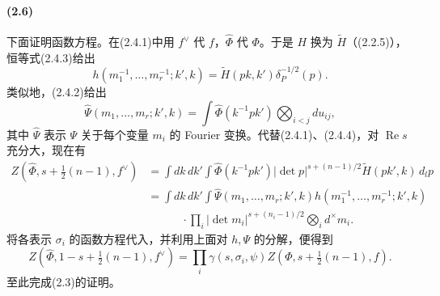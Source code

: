 \paragraph*{(2.6)} 下面证明函数方程。在(2.4.1)中用 $f^\vee$ 代 $f$，$\widehat\Phi$ 代 $\Phi$。于是 $H$ 换为 $\widetilde H$（(2.2.5)），恒等式(2.4.3)给出
\begin{equation}
 h(m_1^{-1},\ldots,m_r^{-1};k',k)=\widetilde H(pk,k')\delta_P^{-1/2}(p).\tag{2.6.1}
\end{equation}
类似地，(2.4.2)给出
\begin{equation}
 \widehat\Psi(m_1,\ldots,m_r;k',k)=\int\widehat\Phi(k^{-1}pk')\bigotimes_{i<j}du_{ij},\tag{2.6.2}
\end{equation}
其中 $\widehat\Psi$ 表示 $\Psi$ 关于每个变量 $m_i$ 的 Fourier 变换。代替(2.4.1)、(2.4.4)，对 $\operatorname{Re}s$ 充分大，现在有
\begin{equation}
\begin{aligned}
 Z(\widehat\Phi,s+\tfrac12(n-1),f^\vee)
 &=\int dk\,dk'\int\widehat\Phi(k^{-1}pk')|\det p|^{s+(n-1)/2}\widetilde H(pk',k)\,d_lp\\
 &=\int dk\,dk'\int\widehat\Psi(m_1,\ldots,m_r;k',k)h(m_1^{-1},\ldots,m_r^{-1};k',k)\\
 &\hspace{3em}\cdot\prod_i|\det m_i|^{s+(n_i-1)/2}\bigotimes_i d^\times m_i.
\end{aligned}\tag{2.6.3}
\end{equation}
将各表示 $\sigma_i$ 的函数方程代入，并利用上面对 $h,\Psi$ 的分解，便得到
\[
 Z(\widehat\Phi,1-s+\tfrac12(n-1),f^\vee)
 =\prod_i\gamma(s,\sigma_i,\psi)Z(\Phi,s+\tfrac12(n-1),f).
\]
至此完成(2.3)的证明。

